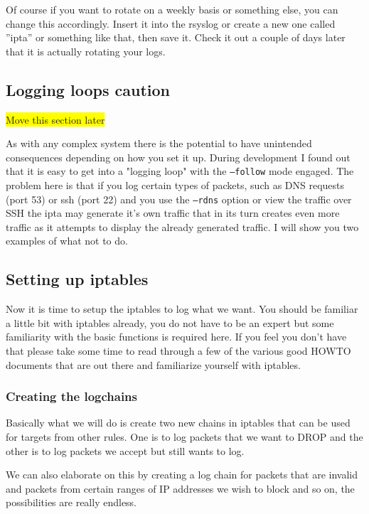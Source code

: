 \documentclass[english,twoside,openright,a4paper,12pt]{article}
\newcommand{\hilight}[1]{\colorbox{yellow}{#1}}
\begin{document}
Of course if you want to rotate on a weekly basis or something else, you can change this accordingly. Insert it into the rsyslog or create a new one called ''ipta'' or something like that, then save it. Check it out a couple of days later that it is actually rotating your logs.

\subsection{Logging loops caution}
\hilight{Move this section later}

As with any complex system there is the potential to have unintended consequences depending on how you set it up. During development I found out that it is easy to get into a "logging loop" with the \texttt{--follow} mode engaged. The problem here is that if you log certain types of packets, such as DNS requests (port 53) or ssh (port 22) and you use the \texttt{--rdns} option or view the traffic over SSH the ipta may generate it's own traffic that in its turn creates even more traffic as it attempts to display the already generated traffic. I will show you two examples of what not to do.

\subsection{Setting up iptables}

Now it is time to setup the iptables to log what we want. You should be familiar a little bit with iptables already, you do not have to be an expert but some familiarity with the basic functions is required here. If you feel you don't have that please take some time to read through a few of the various good HOWTO documents that are out there and familiarize yourself with iptables.

\subsubsection{Creating the logchains}

Basically what we will do is create two new chains in iptables that can be used for targets from other rules. One is to log packets that we want to DROP and the other is to log packets we accept but still wants to log.

We can also elaborate on this by creating a log chain for packets that are invalid and packets from certain ranges of IP addresses we wish to block and so on, the possibilities are really endless.
\end{document}
